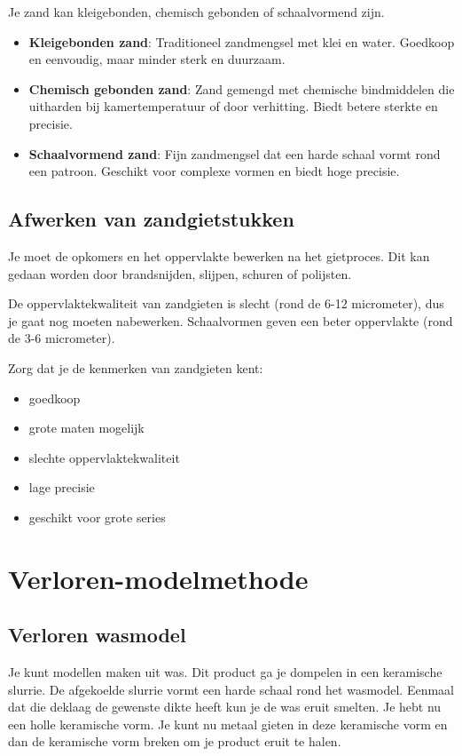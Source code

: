 \documentclass[a4paper,12pt,twoside]{report}
\begin{document}
Je zand kan kleigebonden, chemisch gebonden of schaalvormend zijn.

\begin{conceptbox}[title=Soorten zandbinding]
	\begin{itemize}
		\item \textbf{Kleigebonden zand}: Traditioneel zandmengsel met klei en water. Goedkoop en eenvoudig, maar minder sterk en duurzaam.
		\item \textbf{Chemisch gebonden zand}: Zand gemengd met chemische bindmiddelen die uitharden bij kamertemperatuur of door verhitting. Biedt betere sterkte en precisie.
		\item \textbf{Schaalvormend zand}: Fijn zandmengsel dat een harde schaal vormt rond een patroon. Geschikt voor complexe vormen en biedt hoge precisie.
	\end{itemize}
\end{conceptbox}

\subsection{Afwerken van zandgietstukken}
Je moet de opkomers en het oppervlakte bewerken na het gietproces.
Dit kan gedaan worden door brandsnijden, slijpen, schuren of polijsten.

De oppervlaktekwaliteit van zandgieten is slecht (rond de 6-12 micrometer), dus je gaat nog moeten nabewerken.
Schaalvormen geven een beter oppervlakte (rond de 3-6 micrometer).

\begin{examenbox}
	Zorg dat je de kenmerken van zandgieten kent:
	\begin{itemize}
		\item goedkoop
		\item grote maten mogelijk
		\item slechte oppervlaktekwaliteit
		\item lage precisie
		\item geschikt voor grote series
	\end{itemize}
\end{examenbox}

\section{Verloren-modelmethode}
\subsection{Verloren wasmodel}
Je kunt modellen maken uit was.
Dit product ga je dompelen in een keramische slurrie. 
De afgekoelde slurrie vormt een harde schaal rond het wasmodel.
Eenmaal dat die deklaag de gewenste dikte heeft kun je de was eruit smelten.
Je hebt nu een holle keramische vorm.
Je kunt nu metaal gieten in deze keramische vorm en dan de keramische vorm breken om je product eruit te halen.
\end{document}
